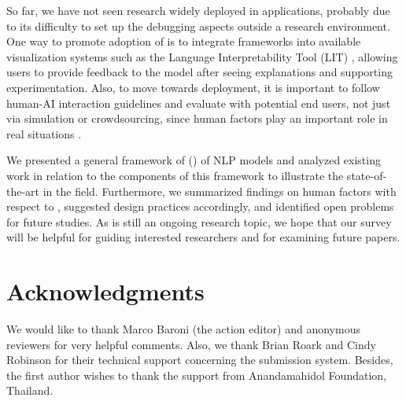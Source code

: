 So far, we have not seen \EBHD research widely deployed in applications,
probably due to its difficulty to set up the debugging aspects outside a research environment.
One way to promote adoption of \EBHD is to integrate \EBHD frameworks into available visualization systems such as the Language Interpretability Tool (LIT) , allowing users to provide feedback to the model after seeing explanations and supporting experimentation.
Also, to move towards deployment, it is important to follow human-AI interaction guidelines  and evaluate \EBHD with potential end users, not just via simulation or crowdsourcing, since human factors play an important role in real situations .

\label{sec:conclusion}
We presented a general framework of \ebhd (\EBHD) of NLP models and analyzed existing work in relation to the components of this framework to illustrate the 
state-of-the-art in the field. 
Furthermore, we summarized findings on human factors with respect to \EBHD, suggested design practices accordingly, and identified open problems for future studies.
As \EBHD is still an ongoing research topic, we hope that our survey will be helpful for guiding interested researchers 
and for examining future \EBHD papers. 
\section*{Acknowledgments}
We would like to thank Marco Baroni (the action editor) and anonymous reviewers for very helpful comments. 
Also, we thank Brian Roark and Cindy Robinson for their technical support concerning the submission system.
Besides, the first author wishes to thank the support from Anandamahidol Foundation, Thailand.



